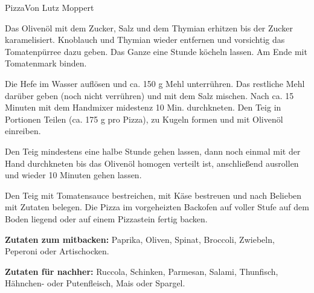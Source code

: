 \begin{recipe}{Pizza}{Von Lutz Moppert}
  \label{Pizza}


  \steps

  Das Olivenöl mit dem Zucker, Salz und dem Thymian erhitzen bis der Zucker
  karamelisiert. Knoblauch und Thymian wieder entfernen und vorsichtig das
  Tomatenpürree dazu geben. Das Ganze eine Stunde köcheln lassen. Am Ende mit
  Tomatenmark binden.

  Die Hefe im Wasser auflösen und ca. 150 g Mehl unterrühren. Das restliche
  Mehl darüber geben (noch nicht verrühren) und mit dem Salz mischen. Nach ca.
  15 Minuten mit dem Handmixer midestenz 10 Min. durchkneten. Den Teig in
  Portionen Teilen (ca. 175 g pro Pizza), zu Kugeln formen und mit Olivenöl
  einreiben.

  Den Teig mindestens eine halbe Stunde gehen lassen, dann noch einmal mit der
  Hand durchkneten bis das Olivenöl homogen verteilt ist, anschließend
  ausrollen und wieder 10 Minuten gehen lassen.

  Den Teig mit Tomatensauce bestreichen, mit Käse bestreuen und nach Belieben
  mit Zutaten belegen. Die Pizza im vorgeheizten Backofen auf voller Stufe
  auf dem Boden liegend oder auf einem Pizzastein fertig backen.

  \textbf{Zutaten zum mitbacken:}
  Paprika, Oliven, Spinat, Broccoli, Zwiebeln, Peperoni oder Artischocken.

  \textbf{Zutaten für nachher:}
  Ruccola, Schinken, Parmesan, Salami, Thunfisch,   Hähnchen- oder
  Putenfleisch, Mais oder Spargel.

\end{recipe}
